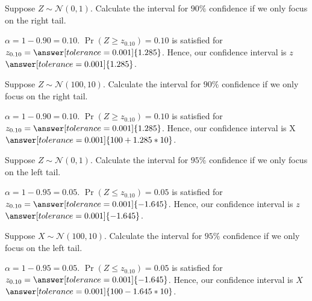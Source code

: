 \documentclass{ximera}
\begin{document}
\begin{problem}
Suppose $Z\sim \mathcal N(0,1)$. Calculate the interval for $90\%$ confidence if we only focus on the right tail. 
\begin{explanation}
$\alpha=1-0.90=0.10$.
$\Pr(Z\geq z_{0.10})=0.10$ is satisfied for $z_{0.10}=\answer[tolerance=0.001]{1.285}$. Hence, our confidence interval is $z$ \wordChoice{\choice[correct]{$\leq$} \choice{$\geq$}} $\answer[tolerance=0.001]{1.285}$.

\end{explanation}
\end{problem}

\begin{problem}
Suppose $Z\sim \mathcal N(100,10)$. Calculate the interval for $90\%$ confidence if we only focus on the right tail. 
\begin{explanation}
$\alpha=1-0.90=0.10$.
$\Pr(Z\geq z_{0.10})=0.10$ is satisfied for $z_{0.10}=\answer[tolerance=0.001]{1.285}$. Hence, our confidence interval is X \wordChoice{\choice[correct]{$\leq$} \choice{$\geq$}} $\answer[tolerance=0.001]{100+1.285*10}$.

\end{explanation}
\end{problem}


\begin{problem}
Suppose $Z\sim \mathcal N(0,1)$. Calculate the interval for $95\%$ confidence if we only focus on the left tail. 
\begin{explanation}
$\alpha=1-0.95=0.05$.
$\Pr(Z\leq z_{0.10})=0.05$ is satisfied for $z_{0.10}=\answer[tolerance=0.001]{-1.645}$. Hence, our confidence interval is $z$ \wordChoice{\choice[correct]{$\geq$} \choice{$\leq$}} $\answer[tolerance=0.001]{-1.645}$.

\end{explanation}
\end{problem}


\begin{problem}
Suppose $X\sim \mathcal N(100,10)$. Calculate the interval for $95\%$ confidence if we only focus on the left tail. 
\begin{explanation}
$\alpha=1-0.95=0.05$.
$\Pr(Z\leq z_{0.10})=0.05$ is satisfied for $z_{0.10}=\answer[tolerance=0.001]{-1.645}$. Hence, our confidence interval is $X$ \wordChoice{\choice[correct]{$\geq$} \choice{$\leq$}} $\answer[tolerance=0.001]{100-1.645*10}$.

\end{explanation}
\end{problem}
\end{document}
